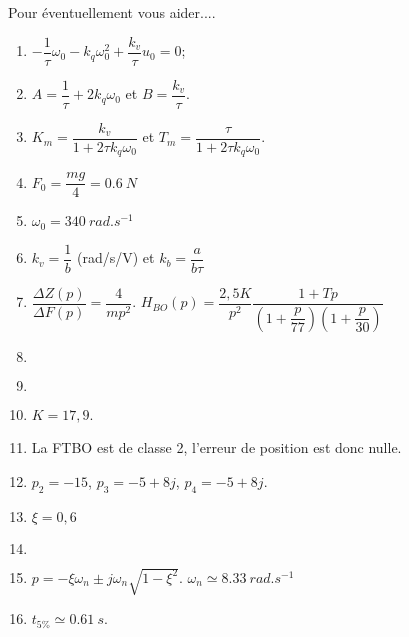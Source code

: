 \begin{multicols}{2}
Pour éventuellement vous aider....
\begin{enumerate}
\item $-\dfrac{1}{\tau}\omega_0 - k_q \omega_0^2 + \dfrac{k_v}{\tau}u_0=0$;
\item $A=\dfrac{1}{\tau}+2k_q\omega_0$ et $B=\dfrac{k_v}{\tau}$.
\item $K_m=\dfrac{k_v}{1+2\tau k_q \omega_0}$ et $T_m=\dfrac{\tau}{1+2\tau k_q \omega_0}$.
\item $F_0=\dfrac{mg}{4}=\SI{0,6}{N}$
\item $\omega_0=\SI{340}{rad.s^{-1}}$
\item $k_v=\dfrac{1}{b}$ (rad/s/V) et $k_b=\dfrac{a}{b\tau}$
\item $\dfrac{\Delta Z(p)}{\Delta F(p)}=\dfrac{4}{mp^2}$. $H_{BO}(p)=\dfrac{2,5 K}{p^2}\dfrac{1+Tp}{\left( 1+\dfrac{p}{77}\right)\left(1+\dfrac{p}{30} \right)}$ 
\item  $\quad$
\item $\quad$
\item $K=17,9$.
\item La FTBO est de classe 2, l'erreur de position est donc nulle.
\item $p_2=-15$, $p_3 = -5+8j$, $p_4=-5+8j$.
\item $\xi=0,6$
\item $\quad$
\item $p=-\xi\omega_n \pm j\omega_n \sqrt{1-\xi^2}$. $\omega_n\simeq \SI{8,33}{rad.s^{-1}}$
\item $t_{5\%}\simeq \SI{0,61}{ s}$. 
\end{enumerate}
\end{multicols}

%
%
%
%
%
%
